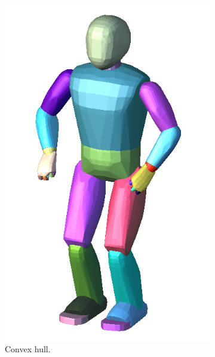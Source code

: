 \begin{figure}
\begin{subfigure}{0.24\columnwidth}
    \includegraphics[width = \columnwidth]
                    {src/chap3-optimal-motion-planning/figure/romeo-convex-hull.png}
    \caption{Convex hull.}
    \label{simple-path-solb}
  \end{subfigure}
  \begin{subfigure}{0.24\columnwidth}
    \centering

\end{subfigure}
\end{figure}
